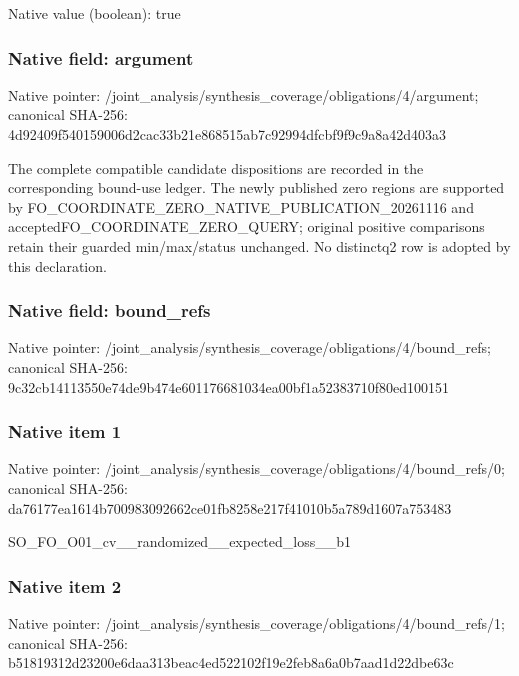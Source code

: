\documentclass[10pt,a4paper]{article}
\begin{document}
Native value (boolean): true

\subsubsection{Native field: argument}
Native pointer: /joint\_\allowbreak{}analysis/synthesis\_\allowbreak{}coverage/obligations/4/argument; canonical SHA-256: 4d92409f540159006d2cac33b21e868515ab7c92994dfcbf9f9c9a8a42d403a3

\begingroup\raggedright\sloppy The complete compatible candidate dispositions are recorded in the corresponding bound-use ledger. The newly published zero regions are supported by FO\_\allowbreak{}COORDINATE\_\allowbreak{}ZERO\_\allowbreak{}NATIVE\_\allowbreak{}PUBLICATION\_\allowbreak{}20261116 and acceptedFO\_\allowbreak{}COORDINATE\_\allowbreak{}ZERO\_\allowbreak{}QUERY;\allowbreak{} original positive comparisons retain their guarded min/\allowbreak{}max/\allowbreak{}status unchanged. No distinctq2 row is adopted by this declaration.\par\endgroup

\subsubsection{Native field: bound\_\allowbreak{}refs}
Native pointer: /joint\_\allowbreak{}analysis/synthesis\_\allowbreak{}coverage/obligations/4/bound\_\allowbreak{}refs; canonical SHA-256: 9c32cb14113550e74de9b474e601176681034ea00bf1a52383710f80ed100151

\subsubsection{Native item 1}
Native pointer: /joint\_\allowbreak{}analysis/synthesis\_\allowbreak{}coverage/obligations/4/bound\_\allowbreak{}refs/0; canonical SHA-256: da76177ea1614b700983092662ce01fb8258e217f41010b5a789d1607a753483

\begingroup\raggedright\sloppy SO\_\allowbreak{}FO\_\allowbreak{}O01\_\allowbreak{}cv\_\allowbreak{}\_\allowbreak{}randomized\_\allowbreak{}\_\allowbreak{}expected\_\allowbreak{}loss\_\allowbreak{}\_\allowbreak{}b1\par\endgroup

\subsubsection{Native item 2}
Native pointer: /joint\_\allowbreak{}analysis/synthesis\_\allowbreak{}coverage/obligations/4/bound\_\allowbreak{}refs/1; canonical SHA-256: b51819312d23200e6daa313beac4ed522102f19e2feb8a6a0b7aad1d22dbe63c
\end{document}
